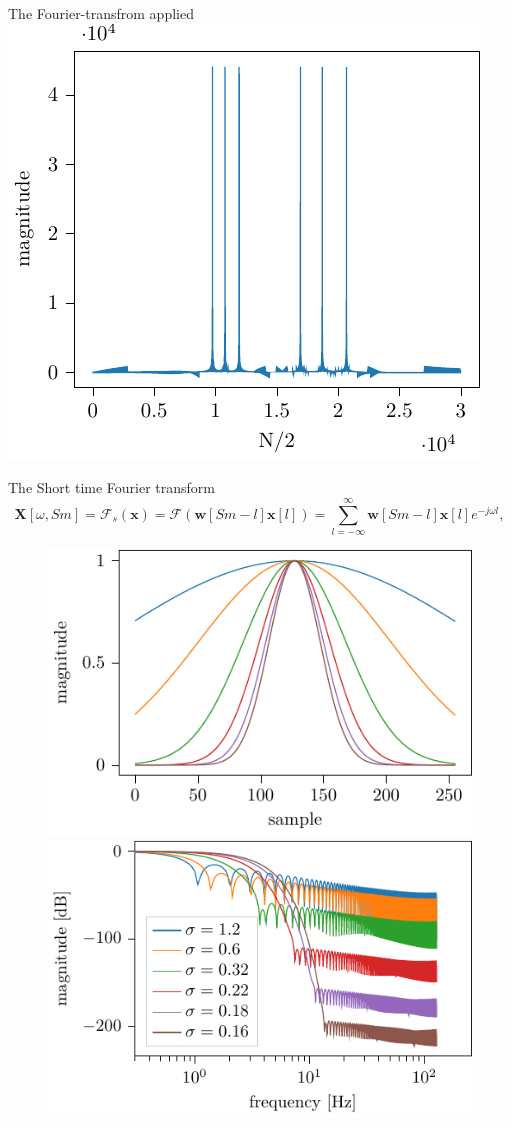 \documentclass[xcolor=dvipsnames]{beamer}
\begin{document}
\begin{frame}{The Fourier-transfrom applied}
\centering
\includegraphics[width=.6\linewidth]{plots/fft.pdf}
\end{frame}


\begin{frame}{The Short time Fourier transform}
\begin{equation}
    \mathbf{X} [\omega, Sm] 
    = \mathcal{F}_s\left(\mathbf{x}\right) = \mathcal{F}\left(\mathbf{w}[Sm - l]\mathbf{x}[l]\right) = \sum_{l = -\infty}^{\infty} \mathbf{w}[Sm - l]\mathbf{x}[l]e^{-j\omega l},
    \label{eq:STFT}
\end{equation}
\begin{figure}
    \centering
    \includegraphics[width=0.49\linewidth]{./img/gaussian_window_sigma_plot.pdf}
    \includegraphics[width=0.49\linewidth]{./img/gaussian_window_sigma_freq_plot.pdf}
\end{figure}
\end{frame}
\end{document}
